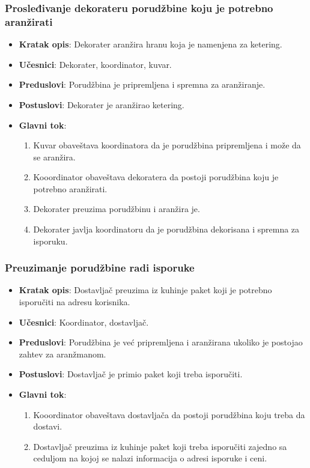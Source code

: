 \subsubsection{Prosleđivanje dekorateru porudžbine koju je potrebno aranžirati}
\begin{itemize}
    \item \textbf{Kratak opis}:
    Dekorater aranžira hranu koja je
    namenjena za ketering.
    \item \textbf{Učesnici}: 
    Dekorater, koordinator, kuvar.
    \item \textbf{Preduslovi}:
    Porudžbina je pripremljena i spremna
    za aranžiranje.
    \item \textbf{Postuslovi}:
    Dekorater je aranžirao ketering.
    \item \textbf{Glavni tok}:
   \begin{enumerate}
        \item Kuvar obaveštava koordinatora da
        je porudžbina pripremljena i može da 
        se aranžira.
        \item Kooordinator obaveštava
        dekoratera da postoji porudžbina koju je potrebno aranžirati.
        \item Dekorater preuzima porudžbinu i aranžira je.
        \item Dekorater javlja koordinatoru da 
        je porudžbina dekorisana i spremna za isporuku.
\end{enumerate}
\end{itemize}


\subsubsection{Preuzimanje porudžbine radi isporuke}
\begin{itemize}
    \item \textbf{Kratak opis}:
    Dostavljač preuzima iz kuhinje paket koji je potrebno isporučiti na adresu korisnika.
    \item \textbf{Učesnici}: 
    Koordinator, dostavljač.
    \item \textbf{Preduslovi}:
    Porudžbina je već pripremljena i aranžirana ukoliko je postojao zahtev za aranžmanom.
    \item \textbf{Postuslovi}:
    Dostavljač je primio paket koji treba isporučiti.
    \item \textbf{Glavni tok}:
   \begin{enumerate}
        \item Kooordinator obaveštava
        dostavljača da postoji porudžbina koju 
        treba da dostavi.
        \item Dostavljač preuzima iz kuhinje paket koji treba isporučiti zajedno sa ceduljom na kojoj se nalazi informacija o adresi isporuke i ceni.
\end{enumerate}
\end{itemize}

